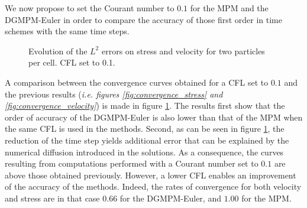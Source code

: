 We now propose to set the Courant number to $0.1$ for the MPM and the DGMPM-Euler in order to compare the accuracy of those first order in time schemes with the same time steps.
\begin{figure}[h!]
  \centering
  {\label{subfig:lowCFL_stress}}
  {\label{subfig:lowCFL_velo}}
  \caption{Evolution of the $L^2$ errors on stress and velocity for two particles per cell. CFL set to 0.1.}
  \label{fig:convergence_lowCFL}
\end{figure}
%   
A comparison between the convergence curves obtained for a CFL set to $0.1$ and the previous results (\textit{i.e. figures \ref{fig:convergence_stress} and \ref{fig:convergence_velocity}}) is made in figure \ref{fig:convergence_lowCFL}.
The results first show that the order of accuracy of the DGMPM-Euler is also lower than that of the MPM when the same CFL is used in the methods.
Second, as can be seen in figure \ref{fig:convergence_lowCFL}, the reduction of the time step yields additional error that can be explained by the numerical diffusion introduced in the solutions.
As a consequence, the curves resulting from computations performed with a Courant number set to $0.1$ are above those obtained previously.
However, a lower CFL enables an improvement of the accuracy of the methods. Indeed, the rates of convergence for both velocity and stress are in that case $0.66$ for the DGMPM-Euler, and $1.00$ for the MPM.

